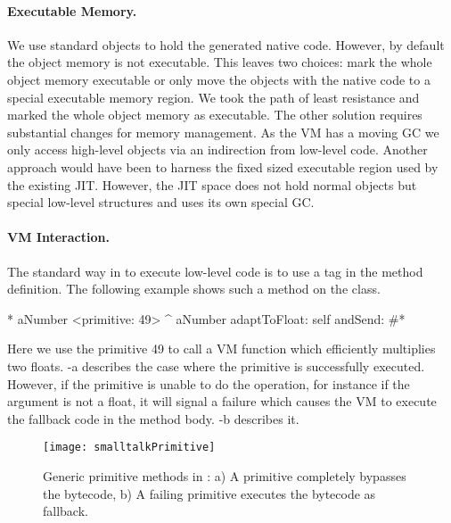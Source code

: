 \paragraph{Executable Memory.}
 
We use standard \ST objects to hold the generated native code.
However, by default the object memory is not executable.
This leaves two choices: mark the whole object memory executable or only move the objects with the native code to a special executable memory region.
We took the path of least resistance and marked the whole object memory as executable.
The other solution requires substantial changes for memory management. As the VM has a moving GC we only access high-level \ST objects via an indirection from low-level code.
Another approach would have been to harness the fixed sized executable region used by the existing JIT.
However, the JIT space does not hold normal \ST objects but special low-level structures and uses its own special GC. 

\paragraph{VM Interaction.}


The standard way in \ST to execute low-level code is to use a tag in the method definition. The following example shows such a method on the  class.
%
\begin{stcode}[label={lst:basic-primitive}]{5}
* aNumber 
	<primitive: 49>
	^ aNumber adaptToFloat: self andSend: #*
\end{stcode}
%
Here we use the primitive 49 to call a VM function which efficiently multiplies two floats. 
-a describes the case where the primitive is successfully executed.
However, if the primitive is unable to do the operation, for instance if the argument  is not a float, it will signal a failure which causes the VM to execute the fallback \ST code in the method body.  
-b describes it. 

\begin{figure}[ht]
	\centering
	\texttt{[image: smalltalkPrimitive]}
	\caption{Generic primitive methods in \PH: a) A primitive completely bypasses the bytecode, b) A failing primitive executes the \ST bytecode as fallback.}
\end{figure}


